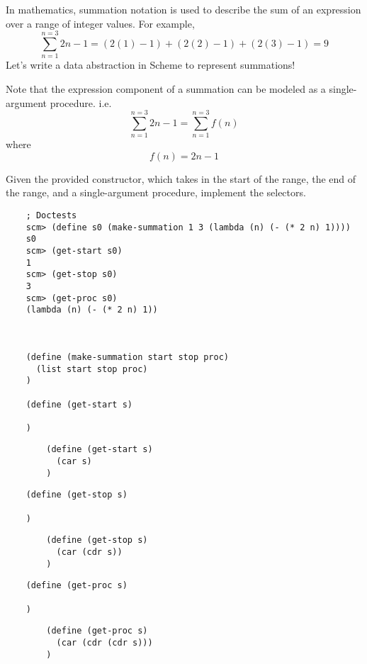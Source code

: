 \begin{blocksection}
    \question In mathematics, summation notation is used to describe the sum of an expression over a range of integer values.
    For example, $$ \sum_{n=1}^{n=3}2n - 1 = (2(1) - 1) + (2(2) - 1) + (2(3) - 1) = 9$$ 
    Let's write a data abstraction in Scheme to represent summations!

    Note that the expression component of a summation can be modeled as a single-argument procedure. 
    i.e. $$ \sum_{n=1}^{n=3}2n - 1 = \sum_{n=1}^{n=3}f(n) $$ where $$ f(n) = 2n - 1 $$

    Given the provided constructor, which takes in the start of the range, 
    the end of the range, and a single-argument procedure, implement the selectors.

\end{blocksection}

\begin{blocksection}
  \begin{lstlisting}
    ; Doctests
    scm> (define s0 (make-summation 1 3 (lambda (n) (- (* 2 n) 1))))
    s0
    scm> (get-start s0)
    1
    scm> (get-stop s0)
    3
    scm> (get-proc s0)
    (lambda (n) (- (* 2 n) 1))



    (define (make-summation start stop proc)
      (list start stop proc)
    )

    (define (get-start s)
    
    )
    \end{lstlisting}

    \begin{solution}[1in]
        \begin{lstlisting}
        (define (get-start s)
          (car s)
        )
        \end{lstlisting}
    \end{solution}

    \begin{lstlisting}
    (define (get-stop s)

    )
    \end{lstlisting}

    \begin{solution}[1in]
        \begin{lstlisting}
        (define (get-stop s)
          (car (cdr s))
        )
        \end{lstlisting}
    \end{solution}

    \begin{lstlisting}
    (define (get-proc s)

    )
    \end{lstlisting}

    \begin{solution}[1in]
        \begin{lstlisting}
        (define (get-proc s)
          (car (cdr (cdr s)))
        )
        \end{lstlisting}
    \end{solution}
\end{blocksection}

